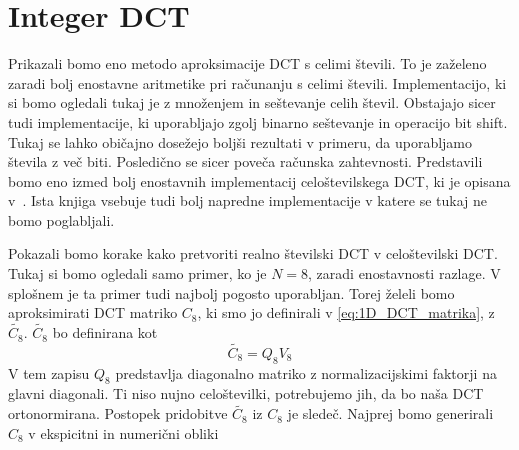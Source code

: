 \documentclass[a4paper,12pt,openright]{book}
\begin{document}
\section{Integer DCT}
Prikazali bomo eno metodo aproksimacije DCT s celimi števili. To je zaželeno zaradi bolj enostavne aritmetike pri računanju s celimi števili. Implementacijo, ki si bomo ogledali tukaj je z množenjem in seštevanje celih števil. Obstajajo sicer tudi implementacije, ki uporabljajo zgolj binarno seštevanje in operacijo bit shift. Tukaj se lahko običajno dosežejo boljši rezultati v primeru, da uporabljamo števila z več biti. Posledično se sicer poveča računska zahtevnosti. Predstavili bomo eno izmed bolj enostavnih implementacij celoštevilskega DCT, ki je opisana v~\cite{britanak2010discrete}. Ista knjiga vsebuje tudi bolj napredne implementacije v katere se tukaj ne bomo poglabljali.\par
Pokazali bomo korake kako pretvoriti realno številski DCT v celoštevilski DCT. Tukaj si bomo ogledali samo primer, ko je $N=8$, zaradi enostavnosti razlage. V splošnem je ta primer tudi najbolj pogosto uporabljan. Torej želeli bomo aproksimirati DCT matriko $C_8$, ki smo jo definirali v \ref{eq:1D_DCT_matrika}, z $\widetilde{C_8}$. $\widetilde{C_8}$ bo definirana kot
\begin{equation}
  \widetilde{C_8} = Q_8 V_8
\label{eq:c_8}
\end{equation}
V tem zapisu $Q_8$ predstavlja diagonalno matriko z normalizacijskimi faktorji na glavni diagonali. Ti niso nujno celoštevilki, potrebujemo jih, da bo naša DCT ortonormirana. Postopek pridobitve $\widetilde{C_8}$ iz $C_8$ je sledeč.
Najprej bomo generirali $C_8$ v ekspicitni in numerični obliki
\end{document}
